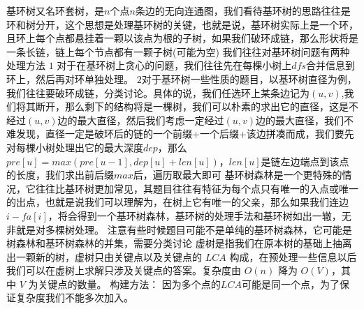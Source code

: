 {}
\markdownRendererSectionEnd \markdownRendererSectionBegin
{}\markdownRendererInterblockSeparator
{}基环树又名环套树，是$ n $个点$ n $条边的无向连通图，我们看待基环树的思路往往是环和树分开，这个思想是处理基环树的关键，也就是说，基环树实际上是一个环，且环上每个点都悬挂着一颗以该点为根的子树，如果我们破环成链，那么形状将是一条长链，链上每个节点都有一颗子树(可能为空)\markdownRendererParagraphSeparator
{}我们往往对基环树问题有两种处理方法\markdownRendererParagraphSeparator
{}$ 1 $ 对于在基环树上贪心的问题，我们往往先在每棵小树上$ dfs $合并信息到环上，然后再对环单独处理。\markdownRendererParagraphSeparator
{}$ 2 $对于基环树一些性质的题目，以基环树直径为例，我们往往要破环成链，分类讨论。具体的说，我们任选环上某条边记为$ (u,v) $,我们将其断开，那么剩下的结构将是一棵树，我们可以朴素的求出它的直径，这是不经过$ (u,v) $边的最大直径，然后我们考虑一定经过$ (u,v) $边的最大直径，我们不难发现，直径一定是破环后的链的一个前缀+一个后缀+该边拼凑而成，我们要先对每棵小树处理出它的最大深度$ dep $，那么$ pre[u]=max(pre[u-1],dep[u]+len[u]) $，$ len[u] $是链左边端点到该点的长度，我们求出前后缀$ max $后，遍历取最大即可\markdownRendererInterblockSeparator
{}\markdownRendererSectionBegin
{}\markdownRendererInterblockSeparator
{}\markdownRendererInterblockSeparator
{}基环树森林是一个更特殊的情况，它往往比基环树更加常见，其题目往往有特征为每个点只有唯一的入点或唯一的出点，也就是说我们可以理解为，在树上它有唯一的父亲，那么如果我们连边$ i-fa[i] $，将会得到一个基环树森林，基环树的处理手法和基环树如出一辙，无非就是对多棵树处理。\markdownRendererParagraphSeparator
{}注意有些时候题目可能不是单纯的基环树森林，它可能是树森林和基环树森林的并集，需要分类讨论\markdownRendererInterblockSeparator
{}
\markdownRendererSectionEnd \markdownRendererSectionBegin
{}\markdownRendererInterblockSeparator
{}\markdownRendererInterblockSeparator
{}
\markdownRendererSectionEnd 
\markdownRendererSectionEnd \markdownRendererSectionBegin
{}\markdownRendererInterblockSeparator
{}虚树是指我们在原本树的基础上抽离出一颗新的树，虚树只由关键点以及关键点的 $LCA$ 构成，在预处理一些信息以后我们可以在虚树上求解只涉及关键点的答案。复杂度由 $O(n)$ 降为 $O(V)$，其中 $V$ 为关键点的数量。\markdownRendererParagraphSeparator
{}构建方法：\markdownRendererParagraphSeparator
{}因为多个点的$ LCA $可能是同一个点，为了保证复杂度我们不能多次加入。\markdownRendererParagraphSeparator
